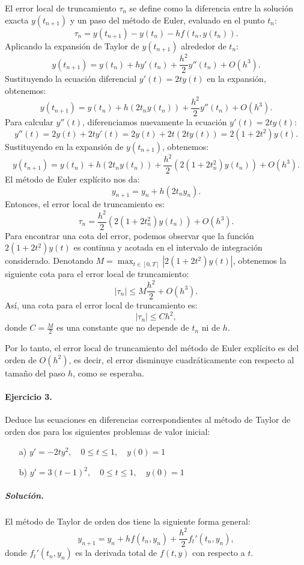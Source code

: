 \documentclass[12pt,letterpaper,oneside]{article}
\begin{document}
 El error local de truncamiento \( \tau_n \) se define como la diferencia entre la solución exacta \( y(t_{n+1}) \) y un paso del método de Euler, evaluado en el punto \( t_n \):
 \[
 \tau_n = y(t_{n+1}) - y(t_n) - h f(t_n, y(t_n)).
 \]
 Aplicando la expansión de Taylor de \(y(t_{n+1})\) alrededor de \(t_n\):
 \[
 y(t_{n+1}) = y(t_n) + h y'(t_n) + \frac{h^2}{2} y''(t_n) + O(h^3).
 \]
 Sustituyendo la ecuación diferencial \(y'(t) = 2ty(t)\) en la expansión, obtenemos:
 \[
 y(t_{n+1}) = y(t_n) + h (2t_n y(t_n)) + \frac{h^2}{2} y''(t_n) + O(h^3).
 \]
 Para calcular \(y''(t)\), diferenciamos nuevamente la ecuación \(y'(t) = 2ty(t)\):
 \[
 y''(t) = 2y(t) + 2t y'(t) = 2y(t) + 2t (2ty(t)) = 2(1 + 2t^2) y(t).
 \]
 Sustituyendo en la expansión de \(y(t_{n+1})\), obtenemos:
 \[
 y(t_{n+1}) = y(t_n) + h (2t_n y(t_n)) + \frac{h^2}{2} (2(1 + 2t_n^2) y(t_n)) + O(h^3).
 \]
 El método de Euler explícito nos da:
 \[
 y_{n+1} = y_n + h(2t_n y_n).
 \]
 Entonces, el error local de truncamiento es:
 \[
 \tau_n = \frac{h^2}{2} (2(1 + 2t_n^2) y(t_n)) + O(h^3).
 \]
 Para encontrar una cota del error, podemos observar que la función \(2(1 + 2t^2)y(t)\) es continua y acotada en el intervalo de integración considerado. Denotando \( M = \max_{t \in [0, T]} |2(1 + 2t^2) y(t)| \), obtenemos la siguiente cota para el error local de truncamiento:
 \[
 |\tau_n| \leq M \frac{h^2}{2} + O(h^3).
 \]
 Así, una cota para el error local de truncamiento es:
 \[
 |\tau_n| \leq C h^2,
 \]
 donde \(C = \frac{M}{2}\) es una constante que no depende de \(t_n\) ni de \(h\).
 
 Por lo tanto, el error local de truncamiento del método de Euler explícito es del orden de \(O(h^2)\), es decir, el error disminuye cuadráticamente con respecto al tamaño del paso \(h\), como se esperaba.
 

\paragraph*{Ejercicio 3.} Deduce las ecuaciones en diferencias correspondientes al método de Taylor de orden dos para los siguientes problemas de valor inicial:
\begin{itemize}
    \item[a)] $y'=-2ty^2,\quad 0\leq t\leq 1,\quad y(0)=1$
    \item[b)] $y'=3(t-1)^2,\quad 0\leq t\leq 1,\quad y(0)=1$
\end{itemize}

\subparagraph*{Solución.} El método de Taylor de orden dos tiene la siguiente forma general:
\[
y_{n+1} = y_n + h f(t_n, y_n) + \frac{h^2}{2} f_t'(t_n, y_n),
\]
donde \( f_t'(t_n, y_n) \) es la derivada total de \( f(t, y) \) con respecto a \( t \).
\end{document}
